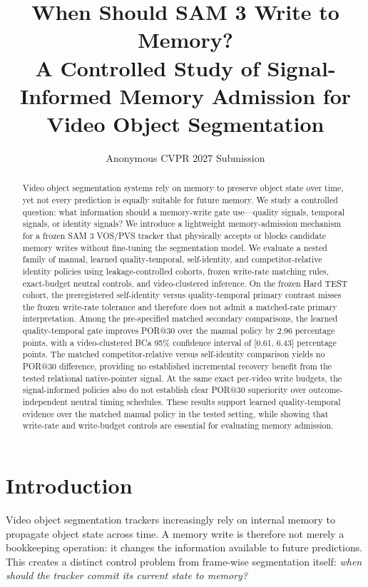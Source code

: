 \documentclass[10pt,twocolumn,letterpaper]{article}
\title{When Should SAM 3 Write to Memory?\\
A Controlled Study of Signal-Informed Memory Admission for
Video Object Segmentation}
\author{Anonymous CVPR 2027 Submission}
\begin{document}
\maketitle

\begin{abstract}
Video object segmentation systems rely on memory to preserve object state
over time, yet not every prediction is equally suitable for future memory.
We study a controlled question: what information should a memory-write gate
use---quality signals, temporal signals, or identity signals?
We introduce a lightweight memory-admission mechanism for a frozen SAM 3
VOS/PVS tracker that physically accepts or blocks candidate memory writes
without fine-tuning the segmentation model.
We evaluate a nested family of manual, learned quality-temporal,
self-identity, and competitor-relative identity policies using
leakage-controlled cohorts, frozen write-rate matching rules, exact-budget
neutral controls, and video-clustered inference.
On the frozen Hard TEST cohort, the preregistered self-identity versus
quality-temporal primary contrast misses the frozen write-rate tolerance
and therefore does not admit a matched-rate primary interpretation.
Among the pre-specified matched secondary comparisons, the learned
quality-temporal gate improves POR@30 over the manual policy by
2.96 percentage points, with a video-clustered BCa 95\% confidence interval
of [0.61, 6.43] percentage points.
The matched competitor-relative versus self-identity comparison yields no
POR@30 difference, providing no established incremental recovery benefit
from the tested relational native-pointer signal.
At the same exact per-video write budgets, the signal-informed policies also
do not establish clear POR@30 superiority over outcome-independent neutral
timing schedules.
These results support learned quality-temporal evidence over the matched
manual policy in the tested setting, while showing that write-rate and
write-budget controls are essential for evaluating memory admission.
\end{abstract}

\section{Introduction}
\label{sec:intro}

Video object segmentation trackers increasingly rely on internal memory to
propagate object state across time.
A memory write is therefore not merely a bookkeeping operation: it changes
the information available to future predictions.
This creates a distinct control problem from frame-wise segmentation itself:
\emph{when should the tracker commit its current state to memory?}
\end{document}
